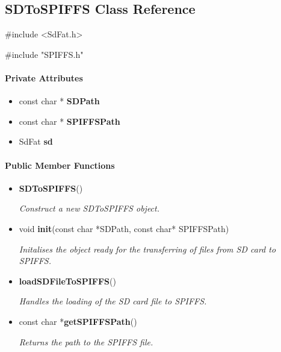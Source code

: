 \subsection{SDToSPIFFS Class Reference}
\label{subsec:sdtospiffs}\mbox{}

    \ttfamily{}

    \#include <SdFat.h>

    \#include "SPIFFS.h"\\

    \rmfamily{}

    \paragraph{Private Attributes}\mbox{}

        \begin{itemize}
            \item const char * \textbf{SDPath}
            \item const char * \textbf{SPIFFSPath}
            \item SdFat \textbf{sd}\\
        \end{itemize}


    \paragraph{Public Member Functions}\mbox{}

        \begin{itemize}
            \item \textbf{SDToSPIFFS}() 
            
                \textit{Construct a new SDToSPIFFS object.}

            \item void \textbf{init}(const char *SDPath, const char* SPIFFSPath) 
            
                \textit{Initalises the object ready for the transferring of files from SD card to SPIFFS.}

            \item \textbf{loadSDFileToSPIFFS}() 
            
                \textit{Handles the loading of the SD card file to SPIFFS.}

            \item const char *\textbf{getSPIFFSPath}() 
            
                \textit{Returns the path to the SPIFFS file.}\\
        \end{itemize}

